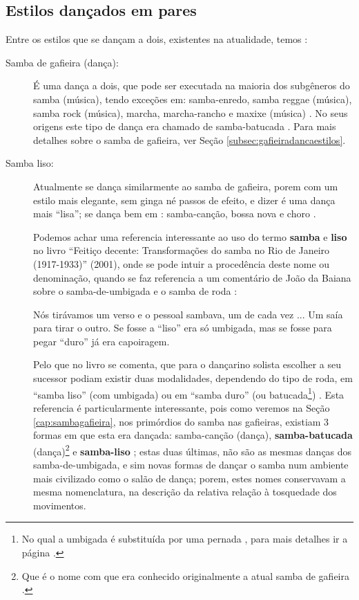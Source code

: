\subsection{Estilos dançados em pares}
\label{subsec:estilosdedancapares}
Entre os estilos que se dançam a dois, existentes na atualidade, temos \cite[pp. 134]{perna2002samba}:
\begin{description}
\item[Samba de gafieira (dança):] 
É uma dança a dois, que pode ser executada na maioria dos subgêneros do samba (música),
tendo exceções em: samba-enredo, samba reggae (música), samba rock (música), 
marcha, marcha-rancho e maxixe (música) \cite[pp. 134]{perna2002samba}.
No seus origens este tipo de dança era chamado de samba-batucada  \cite[pp. 134]{perna2002samba}. 
Para mais detalhes sobre o samba de gafieira, ver Seção \ref{subsec:gafieiradancaestilos}.

\item[Samba liso:] 
Atualmente se dança similarmente ao samba de gafieira, 
porem com um estilo mais elegante, sem ginga né passos de efeito, e dizer é uma dança mais ``lisa'';
se dança bem em : samba-canção, bossa nova e choro \cite[pp. 134]{perna2002samba}.

Podemos achar uma referencia interessante ao uso do termo \textbf{samba} e \textbf{liso}  no livro 
``Feitiço decente: Transformações do samba no Rio de Janeiro (1917-1933)'' (2001),
onde se pode intuir a procedência deste nome ou denominação, 
quando se faz referencia a um comentário de João da Baiana sobre o samba-de-umbigada e o samba de roda \cite[pp. 109]{sandroni2001feitico}: 
\begin{citando}
Nós tirávamos um verso e o pessoal sambava, um de cada vez ... 
Um saía para tirar o outro.
Se fosse a ``liso'' era só umbigada, mas se fosse para pegar ``duro'' já era capoiragem. 
\end{citando}
Pelo que no livro se comenta, que para o dançarino solista  escolher a seu sucessor podiam
existir duas modalidades, dependendo do tipo de roda, em ``samba liso'' (com umbigada) ou em ``samba duro'' 
(ou batucada\footnote{No qual a umbigada é substituída por uma pernada \cite[pp. 109]{sandroni2001feitico},
para mais detalhes ir a página \pageref{ref:batuquedanca}.}) \cite[pp. 109]{sandroni2001feitico}.
Esta referencia 
é particularmente interessante, pois como veremos na Seção \ref{cap:sambagafieira},
nos primórdios do samba nas gafieiras, existiam 3 formas em que esta era dançada: samba-canção (dança),
\textbf{samba-batucada} (dança)\footnote{Que 
é o nome com que era conhecido originalmente a atual samba de gafieira \cite[pp. 143]{perna2002samba}.} 
e \textbf{samba-liso} \cite[pp. 143]{perna2002samba};
estas duas últimas, não são as mesmas danças dos samba-de-umbigada, 
e sim novas formas de dançar o samba num ambiente mais civilizado como o salão de dança;
porem, estes nomes conservavam a mesma nomenclatura, na descrição 
da relativa relação à tosquedade dos movimentos.


\end{description}
